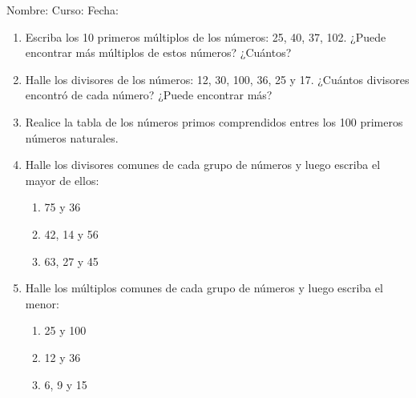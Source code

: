 \documentclass[letterpaper,fleqn]{article}
\newcommand{\LineaNombre}{%
\par
\vspace{\baselineskip}
Nombre:\hrulefill \; Curso: \underline{\hspace*{48pt}} \; Fecha: \underline{\hspace*{2.5cm}} \relax
\par}
\begin{document}
\LineaNombre
\begin{enumerate}
 \item Escriba los 10 primeros múltiplos de los números: 25, 40, 37, 102. ¿Puede encontrar más múltiplos de estos números? ¿Cuántos?\noanswer
 \item Halle los divisores de los números: 12, 30, 100, 36, 25 y 17. ¿Cuántos divisores encontró de cada número? ¿Puede encontrar más?\noanswer
 \item Realice la tabla de los números primos comprendidos entres los 100 primeros números naturales.\noanswer
 \newpage
 \item Halle los divisores comunes de cada grupo de números y luego escriba el mayor de ellos:
 \begin{enumerate}
 \item 75 y 36 \noanswer
 \item 42, 14 y 56 \noanswer
 \item 63, 27 y 45\noanswer
 \end{enumerate}
 \item Halle los múltiplos comunes de cada grupo de números y luego escriba el menor:
 \begin{enumerate}
 \item 25 y 100\noanswer
 \item 12 y 36\noanswer
 \item 6, 9 y 15\noanswer
 \end{enumerate}
 \end{enumerate}
\end{document}
